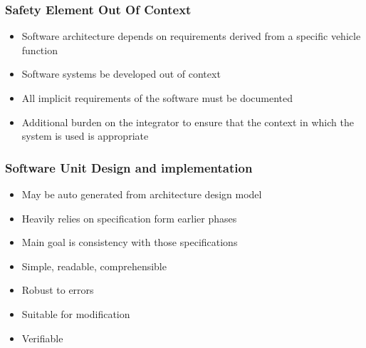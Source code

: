 \documentclass[aspectratio=169]{beamer}
\newif\iftransitions
\newcommand{\cpause}{\iftransitions \pause \fi}
\begin{document}
\begin{frame}
  \frametitle{Safety Element Out Of Context}

  \begin{itemize}
    \item Software architecture depends on requirements derived from a specific vehicle function
    \item Software systems be developed out of context
    \item All implicit requirements of the software must be documented
    \item Additional burden on the integrator to ensure that the context in which the system is used is appropriate
  \end{itemize}
  
\end{frame}

\begin{frame}
  \frametitle{Software Unit Design and implementation}

 \cpause  
  \begin{itemize}
    \item May be auto generated from architecture design model \cpause
    \item Heavily relies on specification form earlier phases \cpause
    \item Main goal is consistency with those specifications \cpause
    \item Simple, readable, comprehensible \cpause
    \item Robust to errors \cpause
    \item Suitable for modification \cpause
    \item Verifiable
  \end{itemize}
  
\end{frame}
\end{document}
